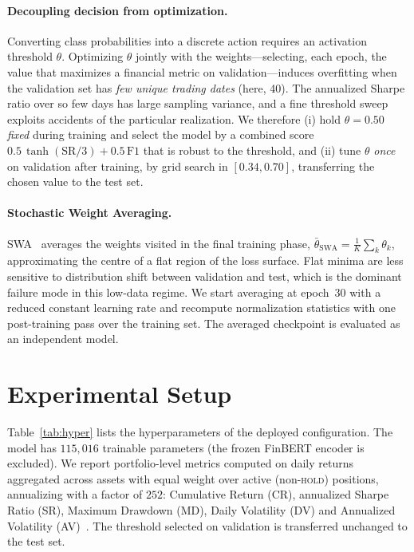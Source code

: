 \documentclass[runningheads]{llncs}
\begin{document}
\paragraph{Decoupling decision from optimization.}
Converting class probabilities into a discrete action requires an activation
threshold $\theta$. Optimizing $\theta$ jointly with the weights---selecting,
each epoch, the value that maximizes a financial metric on validation---induces
overfitting when the validation set has \emph{few unique trading dates} (here,
40). The annualized Sharpe ratio over so few days has large sampling variance,
and a fine threshold sweep exploits accidents of the particular realization.
We therefore (i) hold $\theta=0.50$ \emph{fixed} during training and select the
model by a combined score $0.5\,\tanh(\mathrm{SR}/3)+0.5\,\mathrm{F1}$ that is
robust to the threshold, and (ii) tune $\theta$ \emph{once} on validation after
training, by grid search in $[0.34,0.70]$, transferring the chosen value to the
test set.

\paragraph{Stochastic Weight Averaging.}
SWA~\cite{izmailov2018} averages the weights visited in the final training phase,
$\bar{\theta}_{\text{SWA}}=\frac{1}{K}\sum_{k} \theta_k$, approximating the
centre of a flat region of the loss surface. Flat minima are less sensitive to
distribution shift between validation and test, which is the dominant failure
mode in this low-data regime. We start averaging at epoch~30 with a reduced
constant learning rate and recompute normalization statistics with one
post-training pass over the training set. The averaged checkpoint is evaluated
as an independent model.

\section{Experimental Setup}
Table~\ref{tab:hyper} lists the hyperparameters of the deployed configuration.
The model has $115{,}016$ trainable parameters (the frozen FinBERT encoder is
excluded). We report portfolio-level metrics computed on daily returns
aggregated across assets with equal weight over active (non-\textsc{hold})
positions, annualizing with a factor of $252$:
Cumulative Return (CR), annualized Sharpe Ratio (SR), Maximum Drawdown (MD),
Daily Volatility (DV) and Annualized Volatility (AV)~\cite{sharpe1994}. The
threshold selected on validation is transferred unchanged to the test set.
\end{document}
